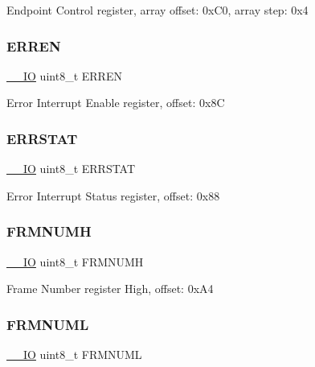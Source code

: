 Endpoint Control register, array offset\+: 0x\+C0, array step\+: 0x4 \mbox{\label{struct_u_s_b___type_ab65f35c56895733ec3c11e246b4d99ec}} 
\subsubsection{\texorpdfstring{ERREN}{ERREN}}
{\footnotesize\ttfamily \mbox{\hyperlink{core__cm0plus_8h_aec43007d9998a0a0e01faede4133d6be}{\+\_\+\+\_\+\+IO}} uint8\+\_\+t E\+R\+R\+EN}

Error Interrupt Enable register, offset\+: 0x8C \mbox{\label{struct_u_s_b___type_aae749069a75330cb4543daa28772e327}} 
\subsubsection{\texorpdfstring{ERRSTAT}{ERRSTAT}}
{\footnotesize\ttfamily \mbox{\hyperlink{core__cm0plus_8h_aec43007d9998a0a0e01faede4133d6be}{\+\_\+\+\_\+\+IO}} uint8\+\_\+t E\+R\+R\+S\+T\+AT}

Error Interrupt Status register, offset\+: 0x88 \mbox{\label{struct_u_s_b___type_aad768bb6ae15f475e43811151dc885a0}} 
\subsubsection{\texorpdfstring{FRMNUMH}{FRMNUMH}}
{\footnotesize\ttfamily \mbox{\hyperlink{core__cm0plus_8h_aec43007d9998a0a0e01faede4133d6be}{\+\_\+\+\_\+\+IO}} uint8\+\_\+t F\+R\+M\+N\+U\+MH}

Frame Number register High, offset\+: 0x\+A4 \mbox{\label{struct_u_s_b___type_abf88cf17801830b6a5bc9c58717253ec}} 
\subsubsection{\texorpdfstring{FRMNUML}{FRMNUML}}
{\footnotesize\ttfamily \mbox{\hyperlink{core__cm0plus_8h_aec43007d9998a0a0e01faede4133d6be}{\+\_\+\+\_\+\+IO}} uint8\+\_\+t F\+R\+M\+N\+U\+ML}

